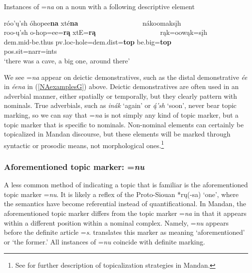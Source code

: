 \begin{exe}
    \item\label{NAdoubleNA} Instances of =\textit{na} on a noun with a following descriptive element

    \glll róo'ų'sh óhopee\textbf{na} xté\textbf{na} ~ ~ ~ ~ ~ ~ ~ ~ ~ ~ ~ nákoomaksįh\\ 
    roo-ų'sh o-hop=ee=\textbf{rą} xtE=\textbf{rą} ~ ~ ~ ~ ~ ~ ~ ~ ~ ~ ~ rąk=oowąk=sįh\\
    dem.mid-\textnormal{be.thus} pv.loc-\textnormal{hole}=dem.dist=\textbf{top} \textnormal{be.big}=\textbf{top} ~ ~ ~ ~ ~ ~ ~ ~ ~ ~ ~ pos.sit=narr=ints\\
    \glt `there was a cave, a big one, around there' \citep[93]{hollow1973a}
\end{exe}

We see =\textit{na} appear on deictic demonstratives, such as the distal demonstrative \textit{ée} in \textit{éena} in (\ref{NAexamplesG}) above. Deictic demonstratives are often used in an adverbial manner, either spatially or temporally, but they clearly pattern with nominals. True adverbials, such as \textit{inák} `again' or \textit{ą́'sh} `soon', never bear topic marking, so we can say that =\textit{na} is not simply any kind of topic marker, but a topic marker that is specific to nominals. Non-nominal elements can certainly be topicalized in Mandan discourse, but these elements will be marked through syntactic or prosodic means, not morphological ones.\footnote{See  for further description of topicalization strategies in Mandan.}

\subsubsection{Aforementioned topic marker: =\textit{nu}}\label{SubSubSubNu}

A less common method of indicating a topic that is familiar is the aforementioned topic marker =\textit{nu}. It is likely a reflex of the Proto-Siouan *rų(-sa) `one', where the semantics have become referential instead of quantificational. In Mandan, the aforementioned topic marker differs from the topic marker =\textit{na} in that it appears within a different position within a nominal complex. Namely, =\textit{nu} appears before the definite article =\textit{s}. \citet[42]{mixco1997a} translates this marker as meaning `aforementioned' or `the former.' All instances of =\textit{nu} coincide with definite marking.


